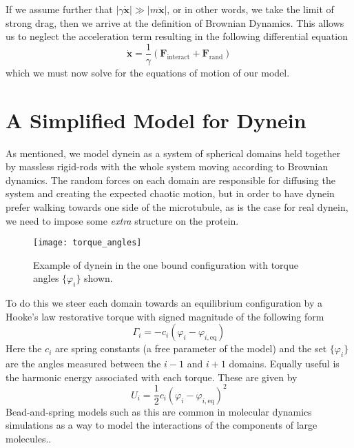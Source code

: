 	If we assume further that $|\gamma\dot{\mathbf{x}}|\gg |m\ddot{\mathbf{x}}|$, or in other words, we take the limit of strong drag, then we arrive at the definition of Brownian Dynamics. This allows us to neglect the acceleration term resulting in the following differential equation
	\begin{equation}
		\dot{\mathbf{x}} = \frac{1}{\gamma}\left( \mathbf{F}_\text{interact} + \mathbf{F}_\text{rand} \right)
	\end{equation}
	which we must now solve for the equations of motion of our model. 
	
	
	\section{A Simplified Model for Dynein}
	As mentioned, we model dynein as a system of spherical domains held together by massless rigid-rods with the whole system moving according to Brownian dynamics. The random forces on each domain are responsible for diffusing the system and creating the expected chaotic motion, but in order to have dynein prefer walking towards one side of the microtubule, as is the case for real dynein, we need to impose some \textit{extra} structure on the protein. 
	
	\begin{figure}[hbt!]
		\centering
		\texttt{[image: torque\_angles]}
		\caption[One bound state]{Example of dynein in the one bound configuration with torque angles $\{\varphi_i\}$ shown.}
		\label{fig:torque angles}
	\end{figure}
	
	To do this we steer each domain towards an equilibrium configuration by a Hooke's law restorative torque with signed magnitude of the following form
	\begin{equation}
		\Gamma_i = -c_i\left(\varphi_i-\varphi_{i,\text{eq}}\right)
	\end{equation}
	Here the $c_i$ are spring constants (a free parameter of the model) and the set $\{\varphi_i\}$ are the angles measured between the $i-1$ and $i+1$ domains. Equally useful is the harmonic energy associated with each torque. These are given by
	\begin{equation}
		U_i = \frac{1}{2}c_i(\varphi_i-\varphi_{i,\text{eq}})^2
	\end{equation} 
	Bead-and-spring models such as this are common in molecular dynamics simulations as a way to model the interactions of the components of large molecules.\cite{bead-spring-model}. 
	
